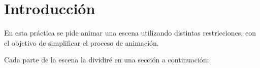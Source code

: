 \section{Introducción}

En esta práctica se pide animar una escena utilizando distintas restricciones, con el objetivo de simplificar el proceso de animación. 

\bigskip

Cada parte de la escena la dividiré en una sección a continuación: